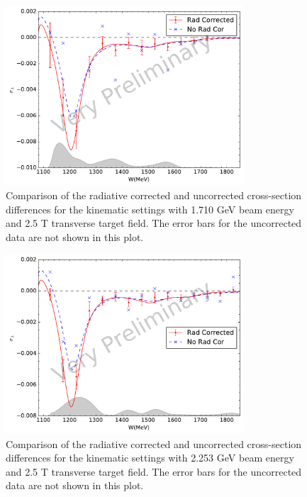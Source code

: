 \begin{figure}[p!]
  \centering
  \includegraphics[width=0.79\textwidth]{figs/xsdiff-model-17102590.pdf}
  \caption[Cross-section differences with $E=1.710$ GeV and $B=2.5$ T.]{Comparison of the radiative corrected and uncorrected cross-section differences for the kinematic settings with 1.710 GeV beam energy and 2.5 T transverse target field. The error bars for the uncorrected data are not shown in this plot. \label{C8S3F2}}
\end{figure}

\begin{figure}[p!]
  \centering
  \includegraphics[width=0.79\textwidth]{figs/xsdiff-model-22532590.pdf}
  \caption[Cross-section differences with $E=2.253$ GeV and $B=2.5$ T.]{Comparison of the radiative corrected and uncorrected cross-section differences for the kinematic settings with 2.253 GeV beam energy and 2.5 T transverse target field. The error bars for the uncorrected data are not shown in this plot. \label{C8S3F3}}
\end{figure}

